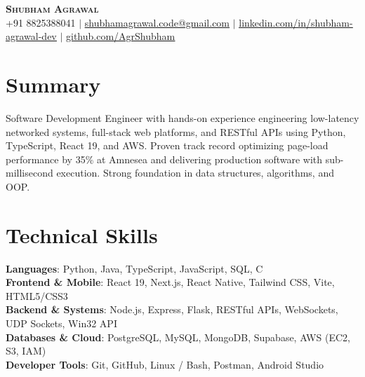 \documentclass[letterpaper,11pt]{article}
\begin{document}
\begin{center}
    \textbf{\Huge \scshape Shubham Agrawal} \\ \vspace{2pt}
    \small +91 8825388041 $|$ \href{mailto:shubhamagrawal.code@gmail.com}{\underline{shubhamagrawal.code@gmail.com}} $|$ 
    \href{https://linkedin.com/in/shubham-agrawal-dev}{\underline{linkedin.com/in/shubham-agrawal-dev}} $|$
    \href{https://github.com/AgrShubham}{\underline{github.com/AgrShubham}}
\end{center}

\section{Summary}
\small{Software Development Engineer with hands-on experience engineering low-latency networked systems, full-stack web platforms, and RESTful APIs using Python, TypeScript, React 19, and AWS. Proven track record optimizing page-load performance by 35\% at Amnesea and delivering production software with sub-millisecond execution. Strong foundation in data structures, algorithms, and OOP.}

\section{Technical Skills}
 \begin{itemize}[leftmargin=0.15in, label={}]
    \small{\item{
     \textbf{Languages}{: Python, Java, TypeScript, JavaScript, SQL, C} \\
     \textbf{Frontend \& Mobile}{: React 19, Next.js, React Native, Tailwind CSS, Vite, HTML5/CSS3} \\
     \textbf{Backend \& Systems}{: Node.js, Express, Flask, RESTful APIs, WebSockets, UDP Sockets, Win32 API} \\
     \textbf{Databases \& Cloud}{: PostgreSQL, MySQL, MongoDB, Supabase, AWS (EC2, S3, IAM)} \\
     \textbf{Developer Tools}{: Git, GitHub, Linux / Bash, Postman, Android Studio}
    }}
 \end{itemize}

\end{document}
